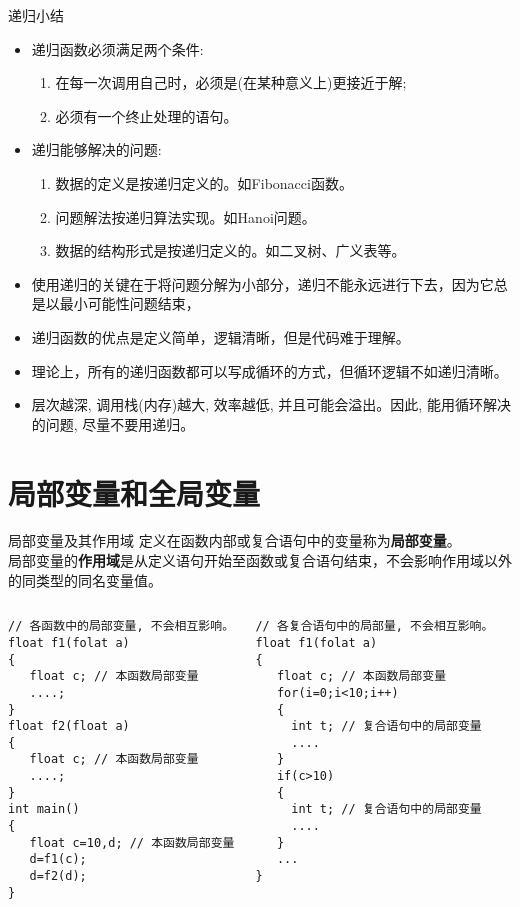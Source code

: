 \begin{frame}{递归小结}
\begin{itemize}
	\item 递归函数必须满足两个条件:
	\begin{enumerate}
		\item 在每一次调用自己时，必须是(在某种意义上)更接近于解;
		\item 必须有一个终止处理的语句。
	\end{enumerate}
    \item 递归能够解决的问题:
    \begin{enumerate}
    	\item 数据的定义是按递归定义的。如Fibonacci函数。
    	\item 问题解法按递归算法实现。如Hanoi问题。
    	\item 数据的结构形式是按递归定义的。如二叉树、广义表等。
    \end{enumerate}
	\item 使用递归的关键在于将问题分解为小部分，递归不能永远进行下去，因为它总是以最小可能性问题结束，
	\item 递归函数的优点是定义简单，逻辑清晰，但是代码难于理解。
	\item 理论上，所有的递归函数都可以写成循环的方式，但循环逻辑不如递归清晰。
	\item 层次越深, 调用栈(内存)越大, 效率越低, 并且可能会溢出。因此, 能用循环解决的问题, 尽量不要用递归。
\end{itemize}
\end{frame}

\section{局部变量和全局变量}

\begin{frame}{局部变量及其作用域}
定义在函数内部或复合语句中的变量称为\textbf{局部变量}。\\
局部变量的\textbf{作用域}是从定义语句开始至函数或复合语句结束，不会影响作用域以外的同类型的同名变量值。 
\begin{columns}[T]
\begin{lstlisting}
// 各函数中的局部变量, 不会相互影响。
float f1(folat a) 
{
   float c; // 本函数局部变量
   ....;
}
float f2(float a)
{ 
   float c; // 本函数局部变量
   ....;
}
int main()
{
   float c=10,d; // 本函数局部变量
   d=f1(c);
   d=f2(d);
}
\end{lstlisting}
\begin{lstlisting}[frame=leftline]
// 各复合语句中的局部量, 不会相互影响。
float f1(folat a) 
{
   float c; // 本函数局部变量
   for(i=0;i<10;i++) 
   {
     int t; // 复合语句中的局部变量 
     ....
   }
   if(c>10)
   {
     int t; // 复合语句中的局部变量 
     ....
   }
   ...
}
\end{lstlisting}
\end{columns}
~\\
\end{frame}

